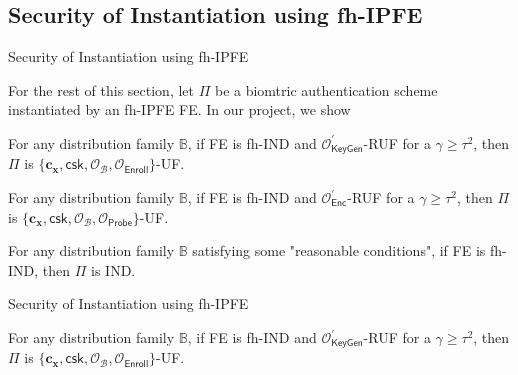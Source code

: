 \subsection{Security of Instantiation using fh-IPFE}


\begin{frame}{Security of Instantiation using fh-IPFE}

For the rest of this section, let $\Pi$ be a biomtric authentication scheme instantiated by an fh-IPFE \textsf{FE}.
\pause
In our project, we show
\pause

\begin{theorem}
	For any distribution family $\mathbb{B}$, if \textsf{FE} is fh-IND and $\mathcal{O}^\prime_{\textsf{KeyGen}}$-RUF for a $\gamma \geq \tau^2$, then $\Pi$ is $\{ \mathbf{c_x}, \textsf{csk}, \mathcal{O}_\mathcal{B}, \mathcal{O}_{\textsf{Enroll}} \}$-UF. 
\end{theorem}
\pause

\begin{theorem}
	For any distribution family $\mathbb{B}$, if \textsf{FE} is fh-IND and $\mathcal{O}^\prime_{\textsf{Enc}}$-RUF for a $\gamma \geq \tau^2$, then $\Pi$ is $\{\mathbf{c_x}, \textsf{csk}, \mathcal{O}_\mathcal{B}, \mathcal{O}_{\textsf{Probe}} \}$-UF. 
\end{theorem}
\pause

\begin{theorem}
	For any distribution family $\mathbb{B}$ satisfying some "reasonable conditions", if \textsf{FE} is fh-IND, then $\Pi$ is IND.

\end{theorem}

\end{frame}


\begin{frame}{Security of Instantiation using fh-IPFE}

{}

\begin{theorem}
	For any distribution family $\mathbb{B}$, if \textsf{FE} is fh-IND and $\mathcal{O}^\prime_{\textsf{KeyGen}}$-RUF for a $\gamma \geq \tau^2$, then $\Pi$ is $\{ \mathbf{c_x}, \textsf{csk}, \mathcal{O}_\mathcal{B}, \mathcal{O}_{\textsf{Enroll}} \}$-UF. 
\end{theorem}


\begin{theorem}
{}
\end{theorem}


\begin{theorem}
{}
\end{theorem}

\end{frame}


